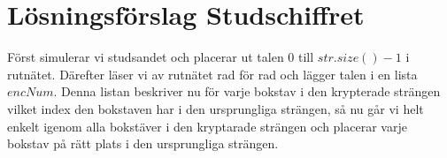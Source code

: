 \documentclass{article}
\begin{document}
\section*{Lösningsförslag Studschiffret}
Först simulerar vi studsandet och placerar ut talen $0$ till $str.size()-1$ i rutnätet.
Därefter läser vi av rutnätet rad för rad och lägger talen i en lista $encNum$.
Denna listan beskriver nu för varje bokstav i den krypterade strängen vilket index
den bokstaven har i den ursprungliga strängen,
så nu går vi helt enkelt igenom alla bokstäver i den kryptarade strängen
 och placerar varje bokstav på rätt plats i den ursprungliga strängen.


\end{document}
